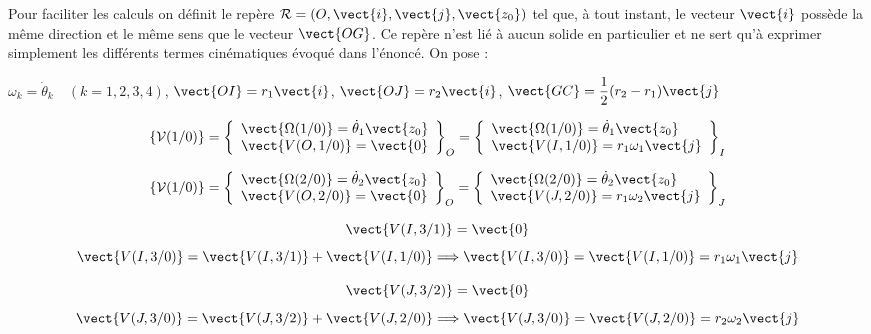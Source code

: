 Pour faciliter les calculs on définit le repère $\mathcal{R}=\left(O,\vect{i},\vect{j},\vect{z_0} \right)$ tel que, à tout instant, le vecteur $\vect{i}$ possède la même direction et le même sens que le vecteur $\vect{OG}$. Ce repère n'est lié à aucun solide en particulier et ne sert qu'à exprimer simplement les différents termes cinématiques évoqué dans l'énoncé. On pose :

$\omega_k = \dot{\theta}_k \quad (k=1,2,3,4)$, $\vect{OI}=r_1 \vect{i}$, $\vect{OJ}=r_2\vect{i}$, $\vect{GC}=\dfrac{1}{2}(r_2-r_1)\vect{j}$



\ifprof
\begin{corrige}
$$
\left\{ \mathcal{V}(1/0)\right\}=
\left\{
\begin{array}{l}
\vect{\Omega(1/0)}= \dot{\theta}_1 \vect{z_0}\\
\vect{V(O,1/0)}= \vect{0}
\end{array}
\right\}_O
=
\left\{
\begin{array}{l}
\vect{\Omega(1/0)}= \dot{\theta}_1 \vect{z_0}\\
\vect{V(I,1/0)}= r_1 \omega_1 \vect{j}
\end{array}
\right\}_I
$$

\end{corrige}
\else\fi

\ifprof
\begin{corrige}
$$
\left\{ \mathcal{V}(1/0)\right\}=
\left\{
\begin{array}{l}
\vect{\Omega(2/0)}= \dot{\theta}_2 \vect{z_0}\\
\vect{V(O,2/0)}= \vect{0}
\end{array}
\right\}_O
=
\left\{
\begin{array}{l}
\vect{\Omega(2/0)}= \dot{\theta}_2 \vect{z_0}\\
\vect{V(J,2/0)}= r_1 \omega_2 \vect{j}
\end{array}
\right\}_J
$$
\end{corrige}
\else\fi

\ifprof
\begin{corrige}

$$
\vect{V(I,3/1)}= \vect{0}
$$
$$
\vect{V(I,3/0)}=\vect{V(I,3/1)}+\vect{V(I,1/0)} \Longrightarrow \vect{V(I,3/0)}=\vect{V(I,1/0)} = r_1\omega_1\vect{j}
$$

$$
\vect{V(J,3/2)}= \vect{0}
$$
$$
\vect{V(J,3/0)}=\vect{V(J,3/2)}+\vect{V(J,2/0)} \Longrightarrow \vect{V(J,3/0)}=\vect{V(J,2/0)} = r_2\omega_2\vect{j}
$$

\end{corrige}
\else
\fi

